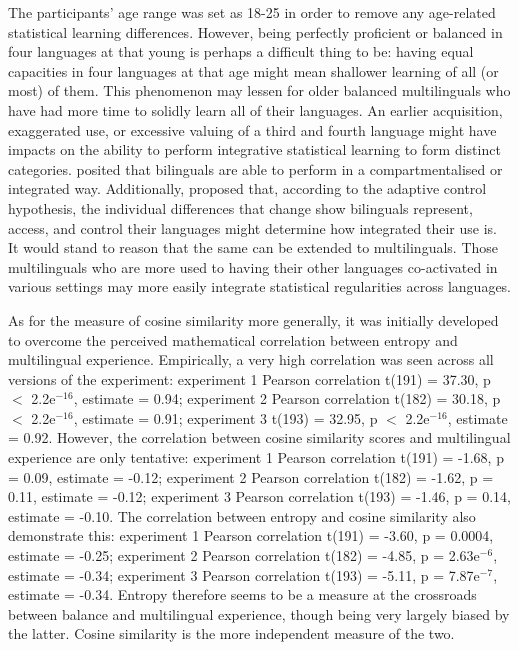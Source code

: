 The participants' age range was set as 18-25 in order to remove any age-related statistical learning differences. However, being perfectly proficient or balanced in four languages at that young is perhaps a difficult thing to be: having equal capacities in four languages at that age might mean shallower learning of all (or most) of them. This phenomenon may lessen for older balanced multilinguals who have had more time to solidly learn all of their languages. An earlier acquisition, exaggerated use, or excessive valuing of a third and fourth language might have impacts on the ability to perform integrative statistical learning to form distinct categories. \textcite{Gullifer2019} posited that bilinguals are able to perform in a compartmentalised or integrated way. Additionally, \textcite{Abutalebi2016} proposed that, according to the adaptive control hypothesis, the individual differences that change show bilinguals represent, access, and control their languages might determine how integrated their use is. It would stand to reason that the same can be extended to multilinguals. Those multilinguals who are more used to having their other languages co-activated in various settings may more easily integrate statistical regularities across languages.

As for the measure of cosine similarity more generally, it was initially developed to overcome the perceived mathematical correlation between entropy and multilingual experience. Empirically, a very high correlation was seen across all versions of the experiment: experiment 1 Pearson correlation t(191) = 37.30, p $<$ 2.2e$^{-16}$, estimate = 0.94; experiment 2 Pearson correlation t(182) = 30.18, p $<$ 2.2e$^{-16}$, estimate = 0.91; experiment 3 t(193) = 32.95, p $<$ 2.2e$^{-16}$, estimate = 0.92. However, the correlation between cosine similarity scores and multilingual experience are only tentative: experiment 1 Pearson correlation t(191) = -1.68, p = 0.09, estimate = -0.12; experiment 2 Pearson correlation t(182) = -1.62, p = 0.11, estimate = -0.12; experiment 3 Pearson correlation t(193) = -1.46, p = 0.14, estimate = -0.10. The correlation between entropy and cosine similarity also demonstrate this: experiment 1 Pearson correlation t(191) = -3.60, p = 0.0004, estimate = -0.25; experiment 2 Pearson correlation t(182) = -4.85, p = 2.63e$^{-6}$, estimate = -0.34; experiment 3 Pearson correlation t(193) = -5.11, p = 7.87e$^{-7}$, estimate = -0.34. Entropy therefore seems to be a measure at the crossroads between balance and multilingual experience, though being very largely biased by the latter. Cosine similarity is the more independent measure of the two.

